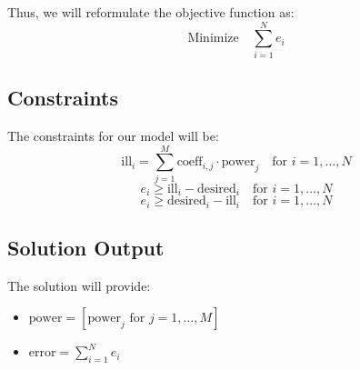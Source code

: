 \documentclass{article}
\begin{document}
Thus, we will reformulate the objective function as:
\[
\text{Minimize} \quad \sum_{i=1}^{N} e_i
\]

\subsection*{Constraints}
The constraints for our model will be:
\[
\text{ill}_i = \sum_{j=1}^{M} \text{coeff}_{i,j} \cdot \text{power}_j \quad \text{for } i = 1, \ldots, N
\]
\[
e_i \geq \text{ill}_i - \text{desired}_i \quad \text{for } i = 1, \ldots, N
\]
\[
e_i \geq \text{desired}_i - \text{ill}_i \quad \text{for } i = 1, \ldots, N
\]

\subsection*{Solution Output}
The solution will provide:
\begin{itemize}
    \item \( \text{power} = [\text{power}_j \text{ for } j = 1, \ldots, M] \)
    \item \( \text{error} = \sum_{i=1}^{N} e_i \)
\end{itemize}
\end{document}
